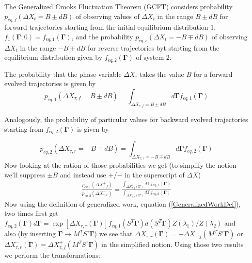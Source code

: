 \documentclass[a4paper,12pt,nofootinbib]{article}
\begin{document}
The Generalized Crooks Fluctuation Theorem (GCFT) considers probability $p_{eq,f}(\Delta X_t = B \pm dB)$ of observing values of $\Delta X_t$ in the range $B\pm dB$ for forward trajectories starting from the initial equilibrium distribution 1, $f_1(\bm{\Gamma};0)=f_{eq,1}(\bm{\Gamma})$, and the probability $p_{eq,r}(\Delta X_t = -B \mp dB)$ of observing $\Delta X_t$ in the range $ -B\mp dB$ for reverse trajectories byt starting from the equilibrium distribution given by $f_{eq,2}(\bm{\Gamma})$ of system 2.

The probability that the phase variable $\Delta X_{\tau}$ takes the value $B$ for a forward evolved trajectories is given by
\begin{equation}
  p_{eq,1}(\Delta X_{\tau,f}=B\pm dB) = \int_{\Delta X_{\tau,f}=B\pm dB} d\bm{\Gamma} f_{eq,1}(\bm{\Gamma})
\end{equation}

Analogously, the probability of particular values for backward evolved trajectories starting from $f_{eq,2}(\bm{\Gamma})$ is given by

\begin{equation}
  p_{eq,2}(\Delta X_{\tau,r}=-B\mp dB) = \int_{\Delta X_{\tau,r}=-B\mp dB} d\bm{\Gamma} f_{eq,2}(\bm{\Gamma})
\end{equation}
Now looking at the ration of those probabilities we get (to simplify the notion we'll suppress $\pm B$ and instead use $+$/$-$ in the superscript of $\Delta X$)
\begin{equation}
\begin{aligned}
  \frac{p_{eq,1}(\Delta X_{\tau,f}^+)}{p_{eq,2}(\Delta X_{\tau,r}^-)}
= \frac{\int_{\Delta X_{\tau,f}^+(\bm{\Gamma})} d\bm{\Gamma} f_{eq,1}(\bm{\Gamma})}{\int_{\Delta X_{\tau,r}^-(\bm{\Gamma})} d\bm{\Gamma} f_{eq,2}(\bm{\Gamma})}
\end{aligned}
\end{equation}
Now using the definition of generalized work, equation (\ref{GeneralizedWorkDef}), two times first get $f_{eq,2}(\bm{\Gamma})d\bm{\Gamma}= \exp[\Delta X_{r,\tau}(\bm{\Gamma})] f_{eq,1}(S^T \bm{\Gamma}) d(S^T \bm{\Gamma}) Z(\lambda_1)/Z(\lambda_2) $ and also (by inserting $\bm{\Gamma} \to M^T S^{\tau} \bm{\Gamma}$) we see that $\Delta X_{\tau,r}(\bm{\Gamma}) = -\Delta X_{\tau,f}(M^T S^{\tau} \bm{\Gamma}) $ or $\Delta X_{\tau,r}^-(\bm{\Gamma}) = \Delta X_{\tau,f}^+(M^T S^{\tau} \bm{\Gamma}) $ in the simplified notion. Using those two results we perform the transformations:
\end{document}
